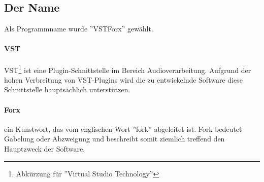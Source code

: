 \subsection{Der Name}
Als Programmname wurde ''VSTForx'' gewählt. 
\paragraph{VST} VST\footnote{Abkürzung für ''Virtual Studio Technology''} ist eine Plugin-Schnittstelle im Bereich Audioverarbeitung. Aufgrund der hohen Verbreitung von VST-Plugins wird die zu entwickelnde Software diese Schnittstelle hauptsächlich unterstützen.

\paragraph{Forx} ein Kunstwort, das vom englischen Wort ''fork'' abgeleitet ist. Fork bedeutet Gabelung oder Abzweigung und beschreibt somit ziemlich treffend den Hauptzweck der Software.